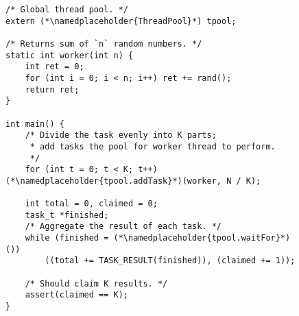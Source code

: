 \begin{figure}[ht]
    \centering
\begin{lstlisting}[frame=tlbr]
/* Global thread pool. */
extern (*\namedplaceholder{ThreadPool}*) tpool;

/* Returns sum of `n` random numbers. */
static int worker(int n) {
    int ret = 0;
    for (int i = 0; i < n; i++) ret += rand();
    return ret;
}

int main() {
    /* Divide the task evenly into K parts; 
     * add tasks the pool for worker thread to perform. 
     */
    for (int t = 0; t < K; t++) (*\namedplaceholder{tpool.addTask}*)(worker, N / K);

    int total = 0, claimed = 0;
    task_t *finished;
    /* Aggregate the result of each task. */
    while (finished = (*\namedplaceholder{tpool.waitFor}*)()) 
        ((total += TASK_RESULT(finished)), (claimed += 1));
    
    /* Should claim K results. */
    assert(claimed == K);
}
\end{lstlisting}
\end{figure}



